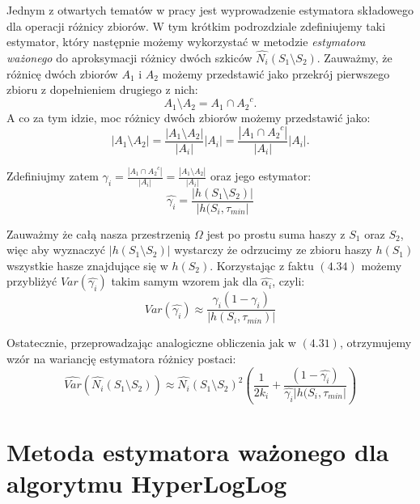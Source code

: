 Jednym z otwartych tematów w pracy \cite{ting} jest wyprowadzenie estymatora składowego dla operacji różnicy zbiorów. W tym krótkim podrozdziale zdefiniujemy taki estymator, który następnie możemy wykorzystać w metodzie \textit{estymatora ważonego} do aproksymacji różnicy dwóch szkiców $\hat{N_i}(S_1 \setminus S_2)$.
\newline
Zauważmy, że różnicę dwóch zbiorów $A_1$ i $A_2$ możemy przedstawić jako przekrój pierwszego zbioru z dopełnieniem drugiego z nich:
\begin{equation}
    A_1 \setminus A_2 = A_1 \cap {A_2}^{c}.
\end{equation}
A co za tym idzie, moc różnicy dwóch zbiorów możemy przedstawić jako:
\begin{equation}
    |A_1 \setminus A_2| = \frac{|A_1 \setminus A_2|}{|A_i|}|A_i| = \frac{|A_1 \cap {A_2}^{c}|}{|A_i|}|A_i|.
\end{equation}

Zdefiniujmy zatem ${\gamma}_{i} = \frac{|A_1 \cap {A_2}^{c}|}{|A_i|} = \frac{|A_1 \setminus A_2|}{|A_i|}$ oraz jego estymator:
\begin{equation}
    \hat{{\gamma}_i} = \frac{|h(S_1 \setminus S_2)|}{|h(S_i, {\tau}_{min}|}
\end{equation}

Zauważmy że całą nasza przestrzenią $\Omega$ jest po prostu suma haszy z $S_1$ oraz $S_2$, więc aby wyznaczyć $|h(S_1 \setminus S_2)|$ wystarczy że odrzucimy ze zbioru haszy $h(S_1)$ wszystkie hasze znajdujące się w $h(S_2)$. Korzystając z faktu $(4.34)$ możemy przybliżyć $Var(\hat{{\gamma}_i})$ takim samym wzorem jak dla $\hat{{\alpha}_i}$, czyli:
\begin{equation}
    Var(\hat{{\gamma}_i}) \approx \frac{{\gamma}_i(1 - {\gamma}_i)}{|h(S_i, {\tau}_{min})|}
\end{equation}

Ostatecznie, przeprowadzając analogiczne obliczenia jak w $(4.31)$, otrzymujemy wzór na wariancję estymatora różnicy postaci:
\begin{equation}
    \hat{Var}(\hat{N_i}(S_1 \setminus S_2)) \approx \hat{N_i}(S_1 \setminus S_2)^{2}(\frac{1}{2{k}_i} + \frac{(1 - \hat{{\gamma}_i})}{\hat{{\gamma}_i}|h(S_i, {\tau}_{min}|})
\end{equation}

\section{Metoda estymatora ważonego dla algorytmu HyperLogLog}
\label{hll_weighted}

